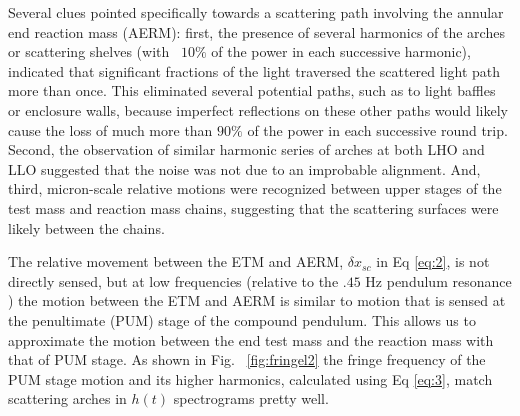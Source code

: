 \documentclass[12pt]{iopart}
\begin{document}

 
Several clues pointed specifically towards a scattering path involving the annular end reaction mass (AERM): first, the presence of several harmonics of the arches or scattering shelves (with ~$10\%$ of the power in each successive harmonic), indicated that significant fractions of the light traversed the scattered light path more than once. This eliminated several potential paths, such as to light baffles or enclosure walls, because imperfect reflections on these other paths would likely cause the loss of much more than $90\%$ of the power in each successive round trip. Second, the observation of similar harmonic series of arches at both LHO and LLO suggested that the noise was not due to an improbable alignment. And, third, micron-scale relative motions were recognized between upper stages of the test mass and reaction mass chains, suggesting that the scattering surfaces were likely between the chains. %
 
The relative movement between the ETM and AERM, ${\delta x_{sc}}$ in Eq \ref{eq:2}, is not directly sensed, but at low frequencies (relative to the $.45$ Hz pendulum resonance ) the motion between the ETM and AERM is similar to motion that is sensed at the penultimate (PUM) stage of the compound pendulum. This allows us to approximate the motion between the end test mass and the reaction mass with that of PUM stage.  As shown in Fig. ~\ref{fig:fringel2} the fringe frequency of the PUM stage motion and its higher harmonics, calculated using Eq \ref{eq:3}, match scattering arches in $h(t)$ spectrograms pretty well. 

\end{document}
